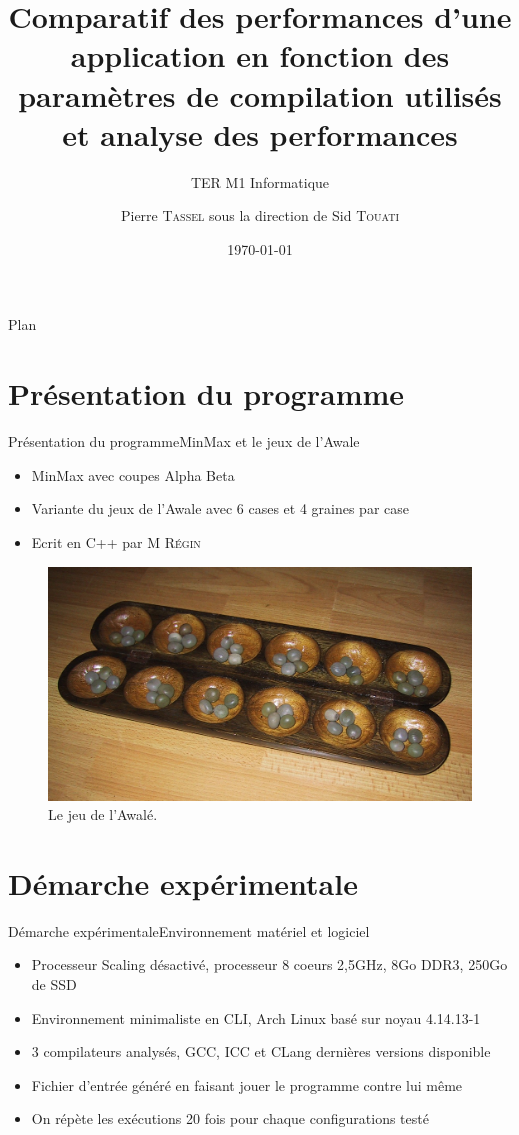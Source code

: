 \documentclass{beamer}
\title{Comparatif des performances d’une application en fonction des paramètres de compilation utilisés et analyse des performances }
\subtitle{TER M1 Informatique}
\author{Pierre \textsc{Tassel} sous la direction de Sid \textsc{Touati}}
\institute[Universitée Nice Sophia Antipolis] 
{Département Informatique\\
Universitée Nice Sophia Antipolis
\and
Master Informatique}
\date{\today}
\begin{document}
\begin{frame}
  \titlepage
\end{frame}

\begin{frame}{Plan}
  \tableofcontents
\end{frame}

\section{Présentation du programme}

\begin{frame}{Présentation du programme}{MinMax et le jeux de l'Awale}
\begin{itemize}
  \item
    MinMax avec coupes Alpha Beta
  \item
    Variante du jeux de l'Awale avec 6 cases et 4 graines par case
  \item
    Ecrit en C++ par M \textsc{Régin}
  \end{itemize}
  \begin{figure}
   \includegraphics[width= 0.7\linewidth, keepaspectratio]{Awale.jpg}
   \caption{Le jeu de l'Awalé.\label{Fig:awale}}
\end{figure}
\end{frame}

\section{Démarche expérimentale}
\begin{frame}{Démarche expérimentale}{Environnement matériel et logiciel}
\begin{itemize}
  \item
  	Processeur Scaling désactivé, processeur 8 coeurs 2,5GHz, 8Go DDR3, 250Go de SSD
  \item
    Environnement minimaliste en CLI, Arch Linux basé sur noyau 4.14.13-1
    \item
    3 compilateurs analysés, GCC, ICC et CLang dernières versions disponible
    \item
    Fichier d'entrée généré en faisant jouer le programme contre lui même
    \item
    On répète les exécutions 20 fois pour chaque configurations testé
\end{itemize}
\end{frame}
\end{document}
